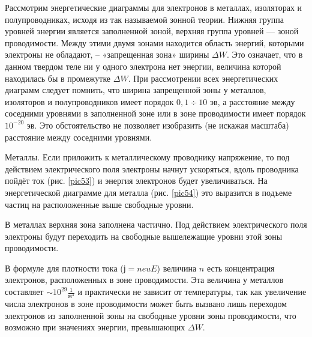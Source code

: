 \documentclass[a4paper,10pt]{book}
\begin{document}
Рассмотрим энергетические диаграммы для электронов в металлах, изоляторах и полупроводниках, исходя из так называемой зонной теории. Нижняя группа уровней энергии является заполненной зоной, верхняя группа уровней — зоной проводимости. Между этими двумя зонами находится область энергий, которыми электроны не обладают, -- «запрещенная зона» ширины $\Delta W$. Это означает, что в данном твердом теле ни у одного электрона нет энергии, величина которой находилась бы в промежутке $\Delta W$. При рассмотрении всех энергетических диаграмм следует помнить, что ширина запрещенной зоны у металлов, изоляторов и полупроводников имеет порядок $0,1 \div 10 \textit{ эв}$, а расстояние между соседними уровнями в заполненной зоне или в зоне проводимости имеет порядок $10^{-20}\textit{ эв}$. Это обстоятельство не позволяет изобразить (не искажая масштаба) расстояние между соседними уровнями.

$\textbf{Металлы.}$ Если приложить к металлическому проводнику напряжение, то под действием электрического поля электроны начнут ускоряться, вдоль проводника пойдёт ток (рис. \ref{pic53}) и энергия электронов будет увеличиваться. На энергетической диаграмме для металла (рис. \ref{pic54}) это выразится в подъеме частиц на расположенные выше свободные уровни.

В металлах верхняя зона заполнена частично. Под действием электрического поля электроны будут переходить на свободные вышележащие уровни этой зоны проводимости.

В формуле для плотности тока ($ј=neuE$) величина $n$ есть концентрация электронов, расположенных в зоне проводимости. Эта величина у металлов составляет $\sim 10^{29}\frac{1}{\textit{м}^3}$ и практически не зависит от температуры, так как увеличение числа электронов в зоне проводимости может быть вызвано лишь переходом электронов из заполненной зоны на свободные уровни зоны проводимости, что возможно при значениях энергии, превышающих $\Delta W$.
\end{document}

